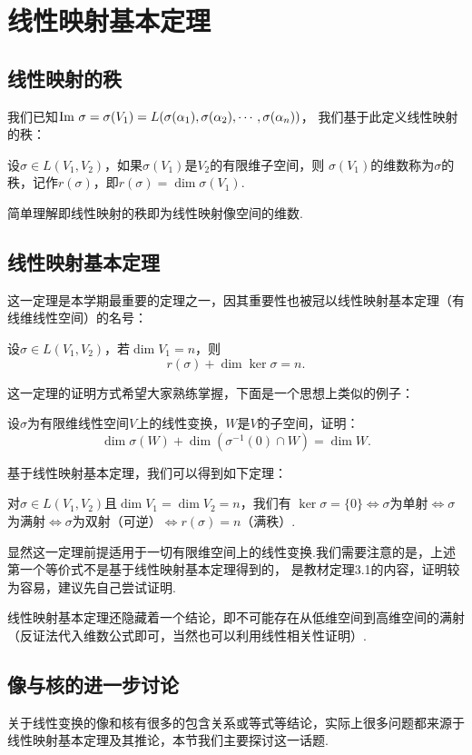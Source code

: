\chapter{线性映射基本定理}

\section{线性映射的秩}
我们已知$\textup{Im }\sigma=\sigma(V_1)=L(\sigma(\alpha_1),\sigma(\alpha_2),\cdots,\sigma(\alpha_n))$，
我们基于此定义线性映射的秩：
\begin{definition}
	设$\sigma\in L(V_1,V_2)$，如果$\sigma(V_1)$是$V_2$的有限维子空间，则
	$\sigma(V_1)$的维数称为$\sigma$的秩，记作$r(\sigma)$，即$r(\sigma)=\dim \sigma(V_1)$.
\end{definition}
简单理解即线性映射的秩即为线性映射像空间的维数.

\section{线性映射基本定理}
这一定理是本学期最重要的定理之一，因其重要性也被冠以线性映射基本定理（有线维线性空间）的名号：
\begin{theorem}
	设$\sigma \in L(V_1,V_2)$，若$\dim V_1=n$，则
	$$r(\sigma)+\dim\ker\sigma=n.$$
\end{theorem}
这一定理的证明方式希望大家熟练掌握，下面是一个思想上类似的例子：
\begin{example}
	设$\sigma$为有限维线性空间$V$上的线性变换，$W$是$V$的子空间，证明：
	$$\dim\sigma(W)+\dim(\sigma^{-1}(0) \cap W)=\dim W.$$
\end{example}
基于线性映射基本定理，我们可以得到如下定理：
\begin{theorem}
	对$\sigma \in L(V_1,V_2)$且$\dim V_1=\dim V_2=n$，我们有
	$\ker\sigma=\{0\}\iff \sigma$为单射$\iff \sigma$为满射$\iff \sigma$为双射（可逆）$\iff r(\sigma)=n$（满秩）.
\end{theorem}
显然这一定理前提适用于一切有限维空间上的线性变换.我们需要注意的是，上述第一个等价式不是基于线性映射基本定理得到的，
是教材定理3.1的内容，证明较为容易，建议先自己尝试证明.

线性映射基本定理还隐藏着一个结论，即不可能存在从低维空间到高维空间的满射（反证法代入维数公式即可，当然也可以利用线性相关性证明）.

\section{像与核的进一步讨论}
关于线性变换的像和核有很多的包含关系或等式等结论，实际上很多问题都来源于线性映射基本定理及其推论，本节我们主要探讨这一话题.

